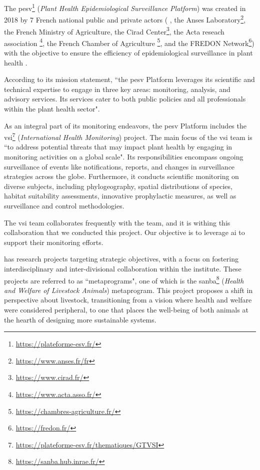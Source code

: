 \label{01_projects}



\label{01_pesv_platform}

The \gls{pesv}\footnote{\url{https://plateforme-esv.fr/}} (\emph{Plant Health Epidemiological Surveillance Platform}) was created in 2018 by 
7 French national public and private actors (
\INRAE{},
the Anses Laboratory\footnote{\url{https://www.anses.fr/fr}}, 
the French Ministry of Agriculture, the Cirad Center\footnote{\url{https://www.cirad.fr/}}, the Acta reseach association \footnote{\url{https://www.acta.asso.fr/}},
the French Chamber of Agriculture \footnote{\url{https://chambres-agriculture.fr/}}, 
and the FREDON Network\footnote{\url{https://fredon.fr/}})  with  the objective to ensure the efficiency of epidemiological surveillance in plant health  .


According to its mission statement, ``the \gls{pesv} Platform leverages its scientific and technical expertise to engage in three key areas: monitoring, analysis, and advisory services. Its services cater to both public policies and all professionals within the plant health sector".

As an integral part of its monitoring endeavors, the \gls{pesv} Platform includes the \gls{vsi}\footnote{\url{https://plateforme-esv.fr/thematiques/GTVSI}} (\emph{International Health Monitoring})  project. The main focus of the \gls{vsi} team is ``to address potential threats that may impact plant health by engaging in monitoring activities on a global scale". Its responsibilities encompass ongoing surveillance of events like notifications, reports, and changes in surveillance strategies across the globe. Furthermore, it conducts scientific monitoring on diverse subjects, including phylogeography, spatial distributions of species, habitat suitability assessments, innovative prophylactic measures, as well as surveillance and control methodologies.

The \gls{vsi} team collaborates frequently with the \bibliome{} team, and it is withing this collaboration that we conducted this project. Our objective is to leverage \gls{ai} to support their monitoring efforts.



\label{01_sanba_metaprogram}

\INRAE{} has research projects targeting strategic objectives, with a focus on fostering interdisciplinary and inter-divisional collaboration within the institute. These projects are referred to as ``metaprograms", one of which is the 
\gls{sanba}\footnote{\url{https://sanba.hub.inrae.fr/}} (\emph{Health and Welfare of Livestock Animals}) metaprogram. This project proposes a shift in perspective about livestock, transitioning from a vision where health and welfare were considered peripheral, to one that places the well-being of both animals at the hearth of designing more sustainable systems.



